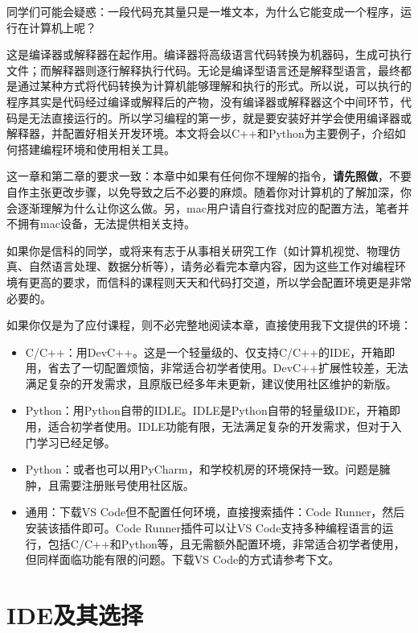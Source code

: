 同学们可能会疑惑：一段代码充其量只是一堆文本，为什么它能变成一个程序，运行在计算机上呢？

这是编译器或解释器在起作用。编译器将高级语言代码转换为机器码，生成可执行文件；而解释器则逐行解释执行代码。无论是编译型语言还是解释型语言，最终都是通过某种方式将代码转换为计算机能够理解和执行的形式。所以说，可以执行的程序其实是代码经过编译或解释后的产物，没有编译器或解释器这个中间环节，代码是无法直接运行的。所以学习编程的第一步，就是要安装好并学会使用编译器或解释器，并配置好相关开发环境。本文将会以C++和Python为主要例子，介绍如何搭建编程环境和使用相关工具。

这一章和第二章的要求一致：本章中如果有任何你不理解的指令，\textbf{请先照做}，不要自作主张更改步骤，以免导致之后不必要的麻烦。随着你对计算机的了解加深，你会逐渐理解为什么让你这么做。另，mac用户请自行查找对应的配置方法，笔者并不拥有mac设备，无法提供相关支持。

\begin{caution}
  如果你是信科的同学，或将来有志于从事相关研究工作（如计算机视觉、物理仿真、自然语言处理、数据分析等），请务必看完本章内容，因为这些工作对编程环境有更高的要求，而信科的课程则天天和代码打交道，所以学会配置环境更是非常必要的。

  如果你仅是为了应付课程，则不必完整地阅读本章，直接使用我下文提供的环境：
  \begin{itemize}
    \item C/C++：用DevC++。这是一个轻量级的、仅支持C/C++的IDE，开箱即用，省去了一切配置烦恼，非常适合初学者使用。DevC++扩展性较差，无法满足复杂的开发需求，且原版已经多年未更新，建议使用社区维护的新版。
    \item Python：用Python自带的IDLE。IDLE是Python自带的轻量级IDE，开箱即用，适合初学者使用。IDLE功能有限，无法满足复杂的开发需求，但对于入门学习已经足够。
    \item Python：或者也可以用PyCharm，和学校机房的环境保持一致。问题是臃肿，且需要注册账号使用社区版。
    \item 通用：下载VS Code但不配置任何环境，直接搜索插件：Code Runner，然后安装该插件即可。Code Runner插件可以让VS Code支持多种编程语言的运行，包括C/C++和Python等，且无需额外配置环境，非常适合初学者使用，但同样面临功能有限的问题。下载VS Code的方式请参考下文。
  \end{itemize}
\end{caution}

\section{IDE及其选择}\label{sec:vscode}

